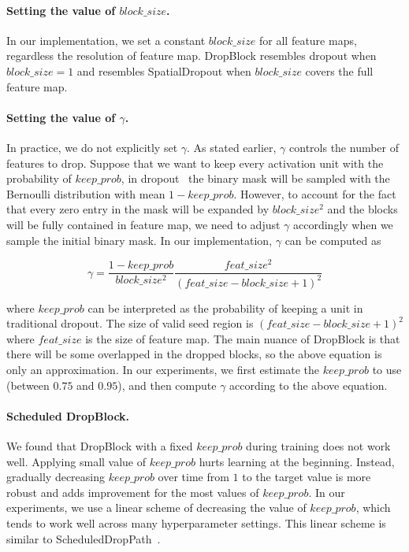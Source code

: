\documentclass{article}
\begin{document}
\paragraph{Setting the value of $block\_size$.} In our implementation, we set a constant $block\_size$ for all feature maps, regardless the resolution of feature map. DropBlock resembles dropout \cite{dropout2014} when $block\_size=1$ and resembles SpatialDropout \cite{tompson2015spatialdropout} when $block\_size$ covers the full feature map.

\paragraph{Setting the value of $\gamma$.} In practice, we do not explicitly set $\gamma$. As stated earlier, $\gamma$ controls the number of features to drop. Suppose that we want to keep every activation unit with the probability of $keep\_prob$, in dropout~\cite{dropout2014} the binary mask will be sampled with the Bernoulli distribution with mean $1-keep\_prob$. However, to account for the fact that every zero entry in the mask will be expanded by $block\_size^2$ and the blocks will be fully contained in feature map, we need to adjust $\gamma$ accordingly when we sample the initial binary mask. In our implementation, $\gamma$ can be computed as

\begin{equation}
\gamma = \frac{1 - keep\_prob}{block\_size^2} \frac{feat\_size^2}{(feat\_size - block\_size + 1)^2}
\end{equation}

where $keep\_prob$ can be interpreted as the probability of keeping a unit in traditional dropout. The size of valid seed region is $(feat\_size - block\_size + 1)^2$ where $feat\_size$ is the size of feature map. The main nuance of DropBlock is that there will be some overlapped in the dropped blocks, so the above equation is only an approximation. In our experiments, we first estimate the $keep\_prob$ to use (between $0.75$ and $0.95$), and then compute $\gamma$ according to the above equation.

\paragraph{Scheduled DropBlock.} We found that DropBlock with a fixed $keep\_prob$ during training does not work well. Applying small value of $keep\_prob$ hurts learning at the beginning. Instead, gradually decreasing $keep\_prob$ over time from $1$ to the target value is more robust and adds improvement for the most values of $keep\_prob$. In our experiments, we use a linear scheme of decreasing the value of $keep\_prob$, which tends to work well across many hyperparameter settings. This linear scheme is similar to ScheduledDropPath~\cite{zoph2017learning}.
\end{document}
